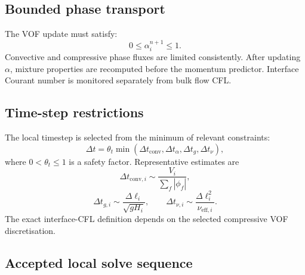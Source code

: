 \documentclass[11pt,a4paper]{article}
\begin{document}
\subsection{Bounded phase transport}

The VOF update must satisfy:
\begin{equation}
  0\le\alpha_i^{n+1}\le1.
\end{equation}
Convective and compressive phase fluxes are limited consistently. After updating $\alpha$, mixture properties are recomputed before the momentum predictor. Interface Courant number is monitored separately from bulk flow CFL.

\subsection{Time-step restrictions}

The local timestep is selected from the minimum of relevant constraints:
\begin{equation}
  \Delta t=\theta_t\min\left(
  \Delta t_{\mathrm{conv}},
  \Delta t_{\alpha},
  \Delta t_g,
  \Delta t_\nu
  \right),
\end{equation}
where $0<\theta_t\le1$ is a safety factor. Representative estimates are
\begin{equation}
  \Delta t_{\mathrm{conv},i}
  \sim \frac{V_i}{\sum_f|\phi_f|},
\end{equation}
\begin{equation}
  \Delta t_{g,i}\sim\frac{\Delta \ell_i}{\sqrt{gH_i}},
  \qquad
  \Delta t_{\nu,i}\sim\frac{\Delta \ell_i^2}{\nu_{\mathrm{eff},i}}.
\end{equation}
The exact interface-CFL definition depends on the selected compressive VOF discretisation.

\subsection{Accepted local solve sequence}
\end{document}
